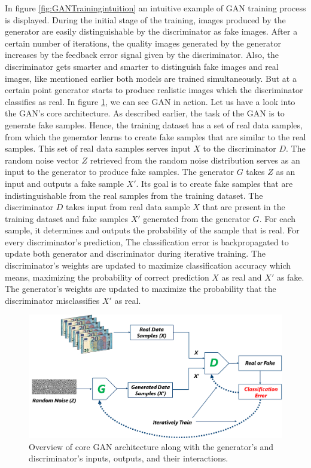 In figure \ref{fig:GANTrainingintuition} an intuitive example of \ac{GAN} training process is displayed. During the initial stage of the training, images produced by the generator are easily distinguishable by the discriminator as fake images. After a certain number of iterations, the quality images generated by the generator increases by the feedback error signal given by the discriminator. Also, the discriminator gets smarter and smarter to distinguish fake images and real images, like mentioned earlier both models are trained simultaneously. But at a certain point generator starts to produce realistic images which the discriminator classifies as real. In figure \ref{fig:GANStructure}, we can see GAN in action. Let us have a look into the GAN's core architecture. As described earlier, the task of the GAN is to generate fake samples. Hence, the training dataset has a set of real data samples, from which the generator learns to create fake samples that are similar to the real samples. This set of real data samples serves input $X$ to the discriminator $D$. The random noise vector $Z$ retrieved from the random noise distribution serves as an input to the generator to produce fake samples. The generator $G$ takes $Z$ as an input and outputs a fake sample $X'$. Its goal is to create fake samples that are indistinguishable from the real samples from the training dataset. The discriminator $D$ takes input from real data sample $X$ that are present in the training dataset and fake samples $X'$ generated from the generator $G$. For each sample, it determines and outputs the probability of the sample that is real. For every discriminator's prediction, 
The classification error is backpropagated to update both generator and discriminator during iterative training. The discriminator's weights are updated to maximize classification accuracy which means, maximizing the probability of correct prediction $X$ as real and $X'$ as fake. The generator's weights are updated to maximize the probability that the discriminator misclassifies $X'$ as real.


\vspace*{0.5cm}
\begin{figure}[H]
        \begin{center}
	    \includegraphics[scale=0.30]{images/Fundamentals/GANStructure.png}
	    \caption[Overview of core \ac{GAN} architecture.]{Overview of core \ac{GAN} architecture along with the generator's and discriminator's inputs, outputs, and their interactions.}
	    \label{fig:GANStructure}
	    \end{center}
\end{figure}


